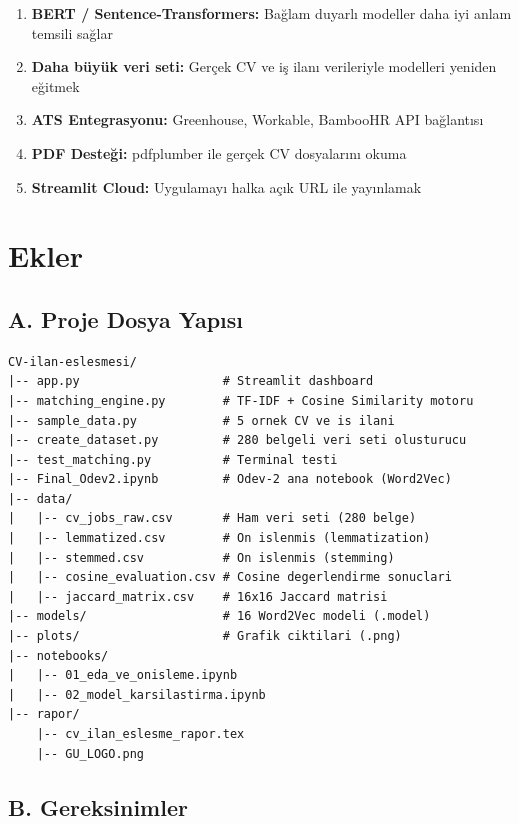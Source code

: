 \documentclass[12pt, a4paper]{article}
\begin{document}
\begin{enumerate}
    \item \textbf{BERT / Sentence-Transformers:} Bağlam duyarlı modeller daha iyi anlam temsili sağlar
    \item \textbf{Daha büyük veri seti:} Gerçek CV ve iş ilanı verileriyle modelleri yeniden eğitmek
    \item \textbf{ATS Entegrasyonu:} Greenhouse, Workable, BambooHR API bağlantısı
    \item \textbf{PDF Desteği:} pdfplumber ile gerçek CV dosyalarını okuma
    \item \textbf{Streamlit Cloud:} Uygulamayı halka açık URL ile yayınlamak
\end{enumerate}

\section*{Ekler}

\subsection*{A. Proje Dosya Yapısı}

\begin{lstlisting}[style=kod, language={}, caption={GitHub Repo Yapısı}]
CV-ilan-eslesmesi/
|-- app.py                    # Streamlit dashboard
|-- matching_engine.py        # TF-IDF + Cosine Similarity motoru
|-- sample_data.py            # 5 ornek CV ve is ilani
|-- create_dataset.py         # 280 belgeli veri seti olusturucu
|-- test_matching.py          # Terminal testi
|-- Final_Odev2.ipynb         # Odev-2 ana notebook (Word2Vec)
|-- data/
|   |-- cv_jobs_raw.csv       # Ham veri seti (280 belge)
|   |-- lemmatized.csv        # On islenmis (lemmatization)
|   |-- stemmed.csv           # On islenmis (stemming)
|   |-- cosine_evaluation.csv # Cosine degerlendirme sonuclari
|   |-- jaccard_matrix.csv    # 16x16 Jaccard matrisi
|-- models/                   # 16 Word2Vec modeli (.model)
|-- plots/                    # Grafik ciktilari (.png)
|-- notebooks/
|   |-- 01_eda_ve_onisleme.ipynb
|   |-- 02_model_karsilastirma.ipynb
|-- rapor/
    |-- cv_ilan_eslesme_rapor.tex
    |-- GU_LOGO.png
\end{lstlisting}

\subsection*{B. Gereksinimler}
\end{document}
